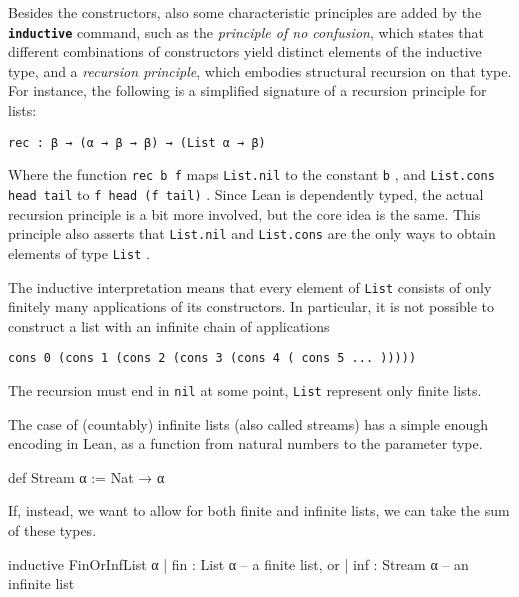 \documentclass[titlepage]{report}
\newcommand\lean[1]{{%
\def\leanmode{1}%
\small \texttt{#1}%
\undef\leanmode%
}}
\newcommand\keyword[1]{{\color{keywordcolor} \textbf{\lean{#1}}}}
\newcommand\inductive{{\keyword{inductive}}}
\begin{document}
Besides the constructors, also some characteristic principles are added by the \inductive{} command, such as the \emph{principle of no confusion}, which states that different combinations of constructors yield distinct elements of the inductive type, and a \emph{recursion principle}, which embodies structural recursion on that type. For instance, the following is a simplified signature of a recursion principle for lists:
\begin{center}
    \lean{rec : β → (α → β → β) → (List α → β)}
\end{center}
Where the function \lean{rec b f} maps \lean{List.nil} to the constant \lean{b}, and \lean{List.cons head tail} to \lean{f head (f tail)}. Since Lean is dependently typed, the actual recursion principle is a bit more involved, but the core idea is the same.
This principle also asserts that \lean{List.nil} and \lean{List.cons} are the only ways to obtain elements of type \lean{List}.


The inductive interpretation means that every element of \lean{List} consists of only
finitely many applications of its constructors. In particular, it is not possible
to construct a list with an infinite chain of  applications
\begin{center}
    \lean{cons 0 (cons 1 (cons 2 (cons 3 (cons 4 ( cons 5 ... )))))}
\end{center}
The recursion must end in \lean{nil} at some point, \lean{List} represent only finite lists.


The case of (countably) infinite lists (also called streams) has a simple enough encoding in Lean, as a function from natural numbers to the parameter type.
\begin{leancode}
    def Stream α := Nat → α
\end{leancode}

If, instead, we want to allow for both finite and infinite lists, we can take the sum of these types.
\begin{leancode}
    inductive FinOrInfList α
    | fin : List α      -- a finite list, or
    | inf : Stream α    -- an infinite list
\end{leancode}
\end{document}
